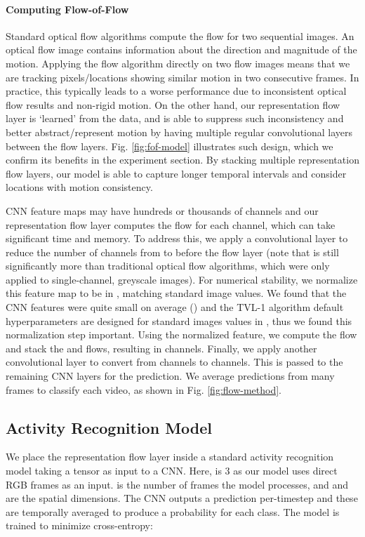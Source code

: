 \documentclass[10pt,twocolumn,letterpaper]{article}
\begin{document}
\vspace{-3pt}
\paragraph{Computing Flow-of-Flow}
Standard optical flow algorithms compute the flow for two sequential images. An optical flow image contains information about the direction and magnitude of the motion. Applying the flow algorithm directly on two flow images means that we are tracking pixels/locations showing similar motion in two consecutive frames.
In practice, this typically leads to a worse performance due to inconsistent optical flow results and non-rigid motion.
On the other hand, our representation flow layer is `learned' from the data, and is able to suppress such inconsistency and better abstract/represent motion by having multiple regular convolutional layers between the flow layers. Fig. \ref{fig:fof-model} illustrates such design, which we confirm its benefits in the experiment section. By stacking multiple representation flow layers, our model is able to capture longer temporal intervals and consider locations with motion consistency.







CNN feature maps may have hundreds or thousands of channels and our representation flow layer computes the flow for each channel, which can take significant time and memory. To address this, we apply a convolutional layer to reduce the number of channels from  to  before the flow layer (note that  is still significantly more than traditional optical flow algorithms, which were only applied to single-channel, greyscale images). For numerical stability, we normalize this feature map to be in , matching standard image values. We found that the CNN features were quite small on average () and the TVL-1 algorithm default hyperparameters are designed for standard images values in , thus we found this normalization step important. Using the normalized feature, we compute the flow and stack the  and  flows, resulting in  channels. Finally, we apply another convolutional layer to convert from  channels to  channels. This is passed to the remaining CNN layers for the prediction.
We average predictions from many frames to classify each video, as shown in Fig. \ref{fig:flow-method}.

\subsection{Activity Recognition Model}
We place the representation flow layer inside a standard activity recognition model taking a  tensor as input to a CNN. Here,  is 3 as our model uses direct RGB frames as an input.  is the number of frames the model processes, and  and  are the spatial dimensions. The CNN outputs a prediction per-timestep and these are temporally averaged to produce a probability for each class. The model is trained to minimize cross-entropy:
\end{document}

